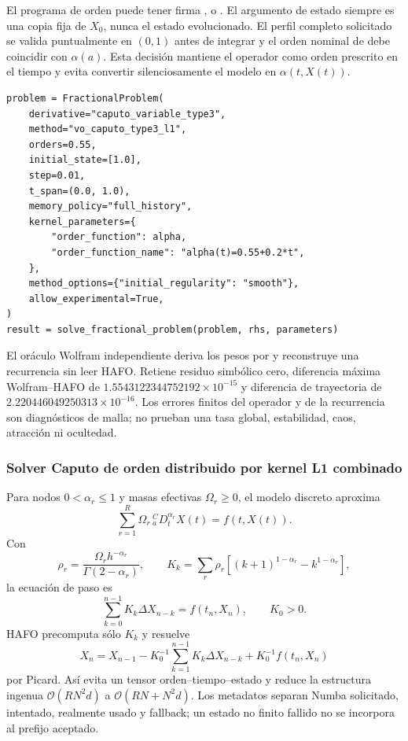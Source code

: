 El programa de orden puede tener firma ,
 o
. El argumento de estado siempre
es una copia fija de \(X_0\), nunca el estado evolucionado. El perfil completo
solicitado se valida puntualmente en \((0,1)\) antes de integrar y el orden
nominal de  debe coincidir con \(\alpha(a)\). Esta
decisión mantiene el operador como orden prescrito en el tiempo y evita convertir
silenciosamente el modelo en \(\alpha(t,X(t))\).

\begin{verbatim}
problem = FractionalProblem(
    derivative="caputo_variable_type3",
    method="vo_caputo_type3_l1",
    orders=0.55,
    initial_state=[1.0],
    step=0.01,
    t_span=(0.0, 1.0),
    memory_policy="full_history",
    kernel_parameters={
        "order_function": alpha,
        "order_function_name": "alpha(t)=0.55+0.2*t",
    },
    method_options={"initial_regularity": "smooth"},
    allow_experimental=True,
)
result = solve_fractional_problem(problem, rhs, parameters)
\end{verbatim}

El oráculo Wolfram independiente deriva los pesos por  y
reconstruye una recurrencia sin leer HAFO. Retiene residuo simbólico cero,
diferencia máxima Wolfram--HAFO de
\(1.5543122344752192\times10^{-15}\) y diferencia de trayectoria de
\(2.220446049250313\times10^{-16}\). Los errores finitos del operador y de la
recurrencia son diagnósticos de malla; no prueban una tasa global, estabilidad,
caos, atracción ni ocultedad.

\subsubsection{Solver Caputo de orden distribuido por kernel L1 combinado}

Para nodos \(0<\alpha_r\le1\) y masas efectivas \(\Omega_r\ge0\), el modelo
discreto aproxima
\[
 \sum_{r=1}^{R}\Omega_r\,{}_a^CD_t^{\alpha_r}X(t)=f(t,X(t)).
\]
Con
\[
 \rho_r=\frac{\Omega_rh^{-\alpha_r}}{\Gamma(2-\alpha_r)},\qquad
 K_k=\sum_r\rho_r\left[(k+1)^{1-\alpha_r}-k^{1-\alpha_r}\right],
\]
la ecuación de paso es
\[
 \sum_{k=0}^{n-1}K_k\Delta X_{n-k}=f(t_n,X_n),\qquad K_0>0.
\]
HAFO precomputa sólo \(K_k\) y resuelve
\[
 X_n=X_{n-1}-K_0^{-1}\sum_{k=1}^{n-1}K_k\Delta X_{n-k}
      +K_0^{-1}f(t_n,X_n)
\]
por Picard. Así evita un tensor orden--tiempo--estado y reduce la estructura
ingenua \(\mathcal O(RN^2d)\) a \(\mathcal O(RN+N^2d)\). Los metadatos
separan Numba solicitado, intentado, realmente usado y fallback; un estado no
finito fallido no se incorpora al prefijo aceptado.

